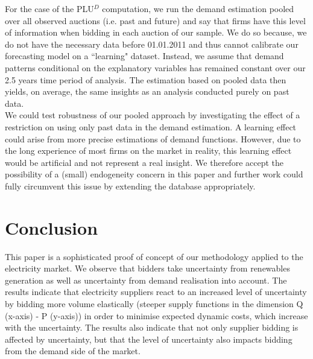 For the case of the PLU$^D$ computation,  we run the demand estimation pooled over all observed auctions (i.e. past and future) and say that firms have this level of information when bidding in each auction of our sample. We do so because, we do not have the necessary data before 01.01.2011 and thus cannot calibrate our forecasting model on a ``learning" dataset. Instead, we assume that demand patterns conditional on the explanatory variables has remained constant over our 2.5 years time period of analysis. 
The estimation based on pooled data then yields, on average, the same insights as an analysis conducted purely on past data. \\


We could test robustness of our pooled approach by investigating the effect of a restriction on using only past data in the demand estimation. A learning effect could arise from more precise estimations of demand functions. However, due to the long experience of most firms on the market in reality, this learning effect would be artificial and not represent a real insight. We therefore accept the possibility of a (small) endogeneity concern in this paper and further work could fully circumvent this issue by extending the database appropriately. \\


\section{Conclusion}
\label{conclusion}
This paper is a sophisticated proof of concept of our methodology applied to the electricity market. We observe that bidders take uncertainty from renewables generation as well as uncertainty from demand realisation into account. The results indicate that electricity suppliers react to an increased level of uncertainty by bidding more volume elastically (steeper supply functions in the dimension Q (x-axis) - P (y-axis)) in order to minimise expected dynamic costs, which increase with the uncertainty. The results also indicate that not only supplier bidding is affected by uncertainty, but that the level of uncertainty also impacts bidding from the demand side of the market.\\ 

